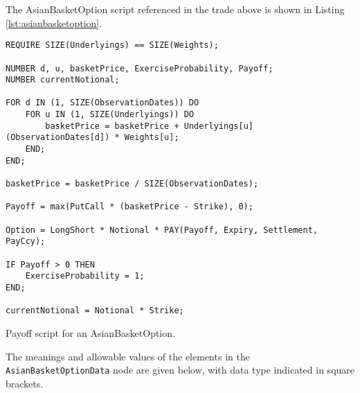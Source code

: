 The AsianBasketOption script referenced in the trade above is
shown in Listing \ref{lst:asianbasketoption}.

\begin{listing}[hbt]
\begin{verbatim}
REQUIRE SIZE(Underlyings) == SIZE(Weights);

NUMBER d, u, basketPrice, ExerciseProbability, Payoff;
NUMBER currentNotional;

FOR d IN (1, SIZE(ObservationDates)) DO
    FOR u IN (1, SIZE(Underlyings)) DO
        basketPrice = basketPrice + Underlyings[u](ObservationDates[d]) * Weights[u];
    END;
END;

basketPrice = basketPrice / SIZE(ObservationDates);

Payoff = max(PutCall * (basketPrice - Strike), 0);

Option = LongShort * Notional * PAY(Payoff, Expiry, Settlement, PayCcy);

IF Payoff > 0 THEN
    ExerciseProbability = 1;
END;

currentNotional = Notional * Strike;
\end{verbatim}
\caption{Payoff script for an AsianBasketOption.}
\label{lst:asianbasketoption}
\end{listing}

The meanings and allowable values of the elements in the
\lstinline!AsianBasketOptionData! node are given below, with data
type indicated in square brackets.

